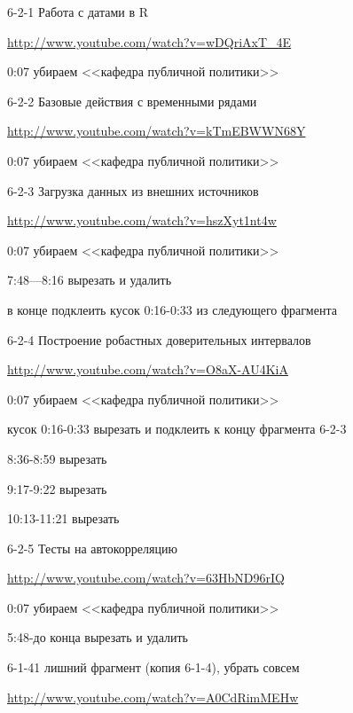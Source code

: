 \documentclass[12pt,a4paper]{article}
\begin{document}
6-2-1 Работа с датами в R

\url{http://www.youtube.com/watch?v=wDQriAxT_4E}

0:07 убираем <<кафедра публичной политики>>


6-2-2 Базовые действия с временными рядами

\url{http://www.youtube.com/watch?v=kTmEBWWN68Y}

0:07 убираем <<кафедра публичной политики>>


6-2-3 Загрузка данных из внешних источников

\url{http://www.youtube.com/watch?v=hszXyt1nt4w}

0:07 убираем <<кафедра публичной политики>>

7:48---8:16 вырезать и удалить

в конце подклеить кусок 0:16-0:33 из следующего фрагмента 

6-2-4  Построение робастных доверительных интервалов

\url{http://www.youtube.com/watch?v=O8aX-AU4KiA}

0:07 убираем <<кафедра публичной политики>>

кусок 0:16-0:33 вырезать и подклеить к концу фрагмента 6-2-3

8:36-8:59 вырезать 

9:17-9:22 вырезать

10:13-11:21 вырезать

6-2-5 Тесты на автокорреляцию

\url{http://www.youtube.com/watch?v=63HbND96rIQ}

0:07 убираем <<кафедра публичной политики>>

5:48-до конца вырезать и удалить

6-1-41 лишний фрагмент (копия 6-1-4), убрать совсем

\url{http://www.youtube.com/watch?v=A0CdRimMEHw}
\end{document}
